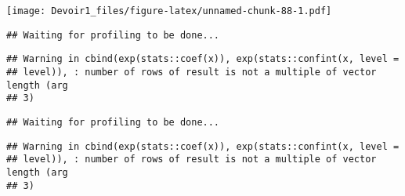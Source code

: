 \documentclass[]{article}
\newenvironment{Shaded}{\begin{snugshade}}{\end{snugshade}}
\newcommand{\KeywordTok}[1]{\textcolor[rgb]{0.13,0.29,0.53}{\textbf{#1}}}
\newcommand{\DataTypeTok}[1]{\textcolor[rgb]{0.13,0.29,0.53}{#1}}
\newcommand{\DecValTok}[1]{\textcolor[rgb]{0.00,0.00,0.81}{#1}}
\newcommand{\StringTok}[1]{\textcolor[rgb]{0.31,0.60,0.02}{#1}}
\newcommand{\OperatorTok}[1]{\textcolor[rgb]{0.81,0.36,0.00}{\textbf{#1}}}
\newcommand{\NormalTok}[1]{#1}
\begin{document}
\texttt{[image: Devoir1\_files/figure-latex/unnamed-chunk-88-1.pdf]}

\begin{Shaded}
\end{Shaded}

\begin{verbatim}
## Waiting for profiling to be done...
\end{verbatim}

\begin{verbatim}
## Warning in cbind(exp(stats::coef(x)), exp(stats::confint(x, level =
## level)), : number of rows of result is not a multiple of vector length (arg
## 3)
\end{verbatim}

\begin{verbatim}
## Waiting for profiling to be done...
\end{verbatim}

\begin{verbatim}
## Warning in cbind(exp(stats::coef(x)), exp(stats::confint(x, level =
## level)), : number of rows of result is not a multiple of vector length (arg
## 3)
\end{verbatim}
\end{document}
